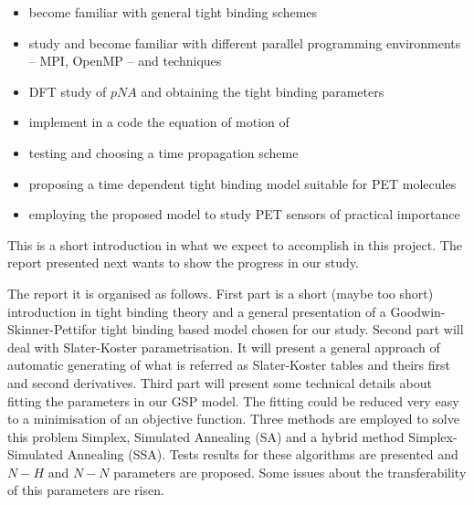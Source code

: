 \begin{itemize}
\item become familiar with general tight binding schemes
\item study and become familiar with different parallel programming
  environments -- MPI, OpenMP -- and techniques
\item DFT study of $pNA$ and obtaining the tight binding parameters
\item implement in a code the equation of motion of \citep{Todorov01}
\item testing and choosing a time propagation scheme
\item proposing a time dependent tight binding model suitable for PET
  molecules
\item employing the proposed model to study PET sensors of practical importance
\end{itemize}
\par{ This is a short introduction in what we expect to accomplish in this  project. The report presented next wants to show the progress in our  study.}
\par{The report it is organised as follows. First part is a short (maybe too short)
introduction in tight binding theory and a general presentation of a
Goodwin-Skinner-Pettifor tight binding based model chosen for our
study. Second part will deal with Slater-Koster parametrisation. It will
present a general approach of automatic generating of what is referred as
Slater-Koster tables and theirs first and second derivatives. Third part will
present some technical details about fitting the parameters in our GSP
model. The fitting could be reduced very easy to a minimisation of an
objective function. Three methods are employed to solve this problem Simplex,
Simulated Annealing (SA) and a hybrid method Simplex-Simulated Annealing
(SSA). Tests results for these algorithms are presented and $N-H$ and $N-N$
parameters are proposed. Some issues about the transferability of this
parameters are risen.}